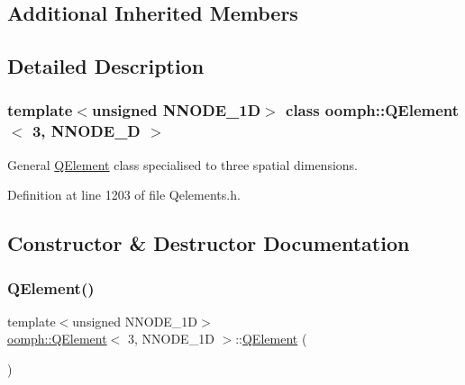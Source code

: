 \subsection*{Additional Inherited Members}


\subsection{Detailed Description}
\subsubsection*{template$<$unsigned N\+N\+O\+D\+E\+\_\+1D$>$\newline
class oomph\+::\+Q\+Element$<$ 3, N\+N\+O\+D\+E\+\_\+D $>$}

General \hyperlink{classoomph_1_1QElement}{Q\+Element} class specialised to three spatial dimensions. 

Definition at line 1203 of file Qelements.\+h.



\subsection{Constructor \& Destructor Documentation}
\mbox{\label{classoomph_1_1QElement_3_013_00_01NNODE__1D_01_4_a67a7cfffb80e609cdfd1ec534a9c19bd}} 
\subsubsection{\texorpdfstring{Q\+Element()}{QElement()}\hspace{0.1cm}{\footnotesize\ttfamily [1/2]}}
{\footnotesize\ttfamily template$<$unsigned N\+N\+O\+D\+E\+\_\+1D$>$ \\
\hyperlink{classoomph_1_1QElement}{oomph\+::\+Q\+Element}$<$ 3, N\+N\+O\+D\+E\+\_\+1D $>$\+::\hyperlink{classoomph_1_1QElement}{Q\+Element} (\begin{DoxyParamCaption}{ }\end{DoxyParamCaption})\hspace{0.3cm}{\ttfamily [inline]}}



